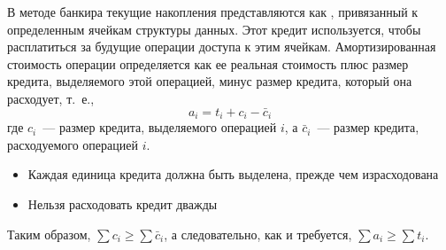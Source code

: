 \begin{frame}{}
 В методе банкира
текущие накопления представляются как ,
привязанный к определенным ячейкам структуры данных. Этот кредит
используется, чтобы расплатиться за будущие операции доступа к этим
ячейкам.  Амортизированная стоимость операции определяется как ее
реальная стоимость плюс размер кредита, выделяемого этой операцией,
минус размер кредита, который она расходует, т.~е.,
$$
a_i = t_i + c_i - \bar{c}_i
$$
где $c_i$~--- размер кредита, выделяемого операцией $i$, а $\bar{c}_i$~---
размер кредита, расходуемого операцией $i$.
%
%
%
\vspace{2em}

\begin{itemize}
\item Каждая единица кредита должна быть выделена, прежде чем  израсходована
\item Нельзя расходовать кредит дважды
\end{itemize}
Таким образом, $\sum c_i \ge \sum \bar{c}_i$, а
следовательно, как и требуется, $\sum a_i \ge \sum t_i$.

\end{frame}

%


